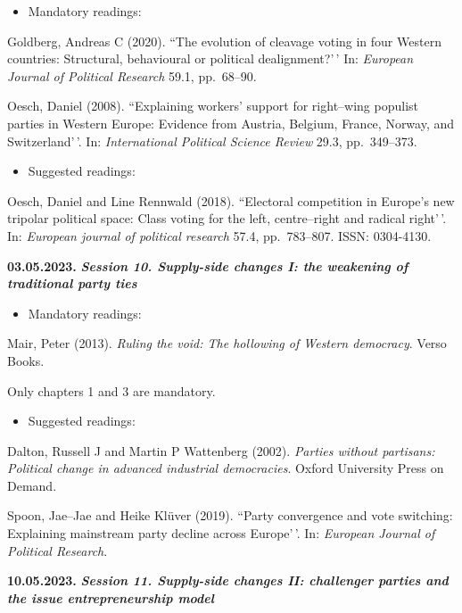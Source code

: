 \documentclass[
  12pt,
]{article}
\providecommand{\tightlist}{%
  \setlength{\itemsep}{0pt}\setlength{\parskip}{0pt}}
\begin{document}
\begin{itemize}
\tightlist
\item
  Mandatory readings:
\end{itemize}

Goldberg, Andreas C (2020). ``The evolution of cleavage voting in four
Western countries: Structural, behavioural or political dealignment?'\,'
In: \emph{European Journal of Political Research} 59.1, pp.~68--90.

Oesch, Daniel (2008). ``Explaining workers' support for right--wing
populist parties in Western Europe: Evidence from Austria, Belgium,
France, Norway, and Switzerland'\,'. In:
\emph{International Political Science Review} 29.3, pp.~349--373.

\begin{itemize}
\tightlist
\item
  Suggested readings:
\end{itemize}

Oesch, Daniel and Line Rennwald (2018). ``Electoral competition in
Europe's new tripolar political space: Class voting for the left,
centre--right and radical right'\,'. In:
\emph{European journal of political research} 57.4, pp.~783--807. ISSN:
0304-4130.

\textbf{03.05.2023.} \textbf{\emph{Session 10. Supply-side changes I:
the weakening of traditional party ties}}

\begin{itemize}
\tightlist
\item
  Mandatory readings:
\end{itemize}

Mair, Peter (2013).
\emph{Ruling the void: The hollowing of Western democracy}. Verso Books.

Only chapters 1 and 3 are mandatory.

\begin{itemize}
\tightlist
\item
  Suggested readings:
\end{itemize}

Dalton, Russell J and Martin P Wattenberg (2002).
\emph{Parties without partisans: Political change in advanced industrial democracies}.
Oxford University Press on Demand.

Spoon, Jae--Jae and Heike Klüver (2019). ``Party convergence and vote
switching: Explaining mainstream party decline across Europe'\,'. In:
\emph{European Journal of Political Research}.

\textbf{10.05.2023.} \textbf{\emph{Session 11. Supply-side changes II:
challenger parties and the issue entrepreneurship model}}
\end{document}
